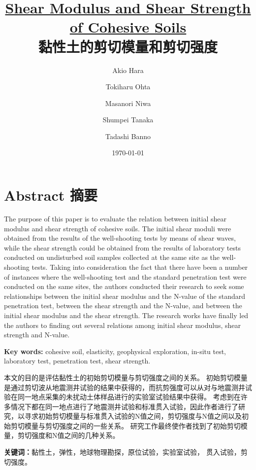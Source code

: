 \documentclass{bilidoc}
\title{\textbf{\href{http://dx.doi.org/10.3208/sandf1972.14.3_1}{Shear Modulus and Shear Strength of Cohesive Soils}\\黏性土的剪切模量和剪切强度}}
\date{\today}
\author{Akio Hara \and Tokiharu Ohta \and Masanori Niwa \and Shumpei Tanaka \and Tadashi Banno}
\begin{document}
\maketitle

\section*{Abstract 摘要}

\begin{paracol}{2}

    The purpose of this paper is to evaluate the relation between initial shear modulus and shear strength of cohesive soils. The initial shear moduli were obtained from the results of the well-shooting tests by means of shear waves, while the shear strength could be obtained from the results of laboratory tests conducted on undisturbed soil samples collected at the same site as the well-shooting tests. Taking into consideration the fact that there have been a number of instances where the well-shooting test and the standard penetration test were conducted on the same sites, the authors conducted their research to seek some relationships between the initial shear modulus and the N-value of the standard penetration test, between the shear strength and the N-value, and between the initial shear modulus and the shear strength. The research works have finally led the authors to finding out several relations among initial shear modulus, shear strength and N-value.

    \textbf{Key words: }cohesive soil, elasticity, geophysical exploration, in-situ test, laboratory test, penetration test, shear strength.

    \switchcolumn

    本文的目的是评估黏性土的初始剪切模量与剪切强度之间的关系。 初始剪切模量是通过剪切波从地震测井试验的结果中获得的，而抗剪强度可以从对与地震测井试验在同一地点采集的未扰动土体样品进行的实验室试验结果中获得。 考虑到在许多情况下都在同一地点进行了地震测井试验和标准贯入试验，因此作者进行了研究，以寻求初始剪切模量与标准贯入试验的N值之间，剪切强度与N值之间以及初始剪切模量与剪切强度之间的一些关系。 研究工作最终使作者找到了初始剪切模量，剪切强度和N值之间的几种关系。

    \textbf{关键词：}黏性土，弹性，地球物理勘探，原位试验，实验室试验， 贯入试验，剪切强度。

\end{paracol}












\end{document}
